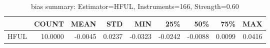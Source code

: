 \begin{table}[ht]
\centering
\caption{bias summary: Estimator=HFUL, Instruments=166, Strength=0.60}
\begin{tabular}{lrrrrrrrr}
\toprule
 & COUNT & MEAN & STD & MIN & 25\% & 50\% & 75\% & MAX \\
\midrule
HFUL & 10.0000 & -0.0045 & 0.0237 & -0.0323 & -0.0242 & -0.0088 & 0.0099 & 0.0416 \\
\bottomrule
\end{tabular}
\end{table}

